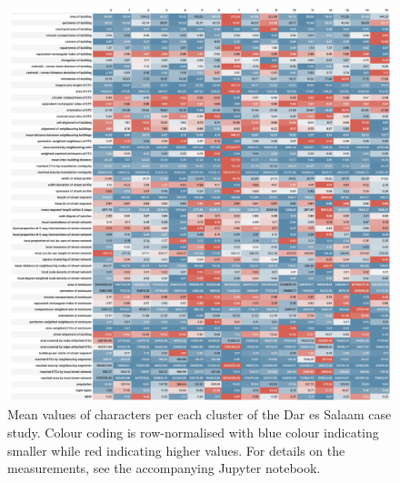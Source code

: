 \begin{figure}
  \includegraphics[width=\linewidth]{figures/dar_es_salaam_means.png}
  \caption{Mean values of characters per each cluster of the Dar es Salaam case study.
  Colour coding is row-normalised with blue colour indicating smaller while red indicating
  higher values. For details on the measurements, see the accompanying Jupyter notebook.
  }
  \label{fig:means_des}
\end{figure}

